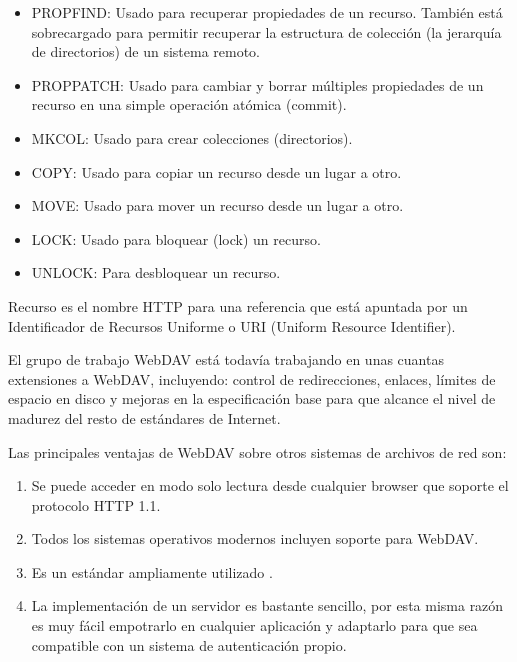 \begin{itemize}

	\item PROPFIND: Usado para recuperar propiedades de un recurso. También está sobrecargado para permitir recuperar la estructura de colección (la jerarquía de directorios) de un sistema remoto.
	
	\item PROPPATCH: Usado para cambiar y borrar múltiples propiedades de un recurso en una simple operación atómica (commit).
	
	\item MKCOL: Usado para crear colecciones (directorios).
	
	\item COPY: Usado para copiar un recurso desde un lugar a otro.
	
	\item MOVE: Usado para mover un recurso desde un lugar a otro.
	
	\item LOCK: Usado para bloquear (lock) un recurso.
	
	\item UNLOCK: Para desbloquear un recurso.

\end{itemize}

Recurso es el nombre HTTP para una referencia que está apuntada por un Identificador de Recursos Uniforme o URI (Uniform Resource Identifier).

El grupo de trabajo WebDAV \cite{ietf} está todavía trabajando en unas cuantas extensiones a WebDAV, incluyendo: control de redirecciones, enlaces, límites de espacio en disco y mejoras en la especificación base para que alcance el nivel de madurez del resto de estándares de Internet.

Las principales ventajas de WebDAV sobre otros sistemas de archivos de red son:

\begin{enumerate}

	\item Se puede acceder en modo solo lectura desde cualquier browser que soporte el protocolo HTTP 1.1.
	
	\item Todos los sistemas operativos modernos incluyen soporte para WebDAV.
	
	\item Es un estándar ampliamente utilizado \cite{webdav_rfc}.
	
	\item La implementación de un servidor es bastante sencillo, por esta misma razón es muy fácil empotrarlo en cualquier aplicación y adaptarlo para que sea compatible con un sistema de autenticación propio.
	
\end{enumerate}


